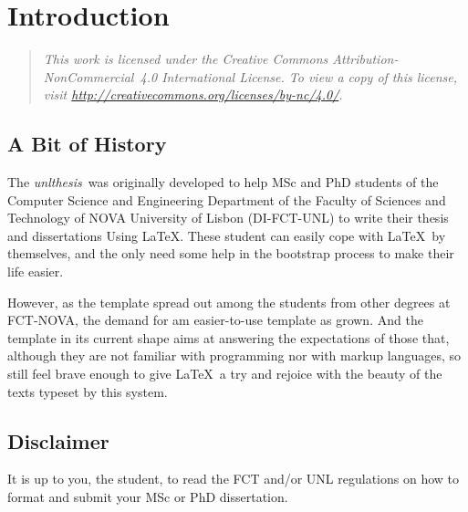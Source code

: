 \newcommand{\unlthesis}{\emph{unlthesis}}
\newcommand{\unlthesisclass}{\texttt{unlthesis.cls}}


\chapter{Introduction}
\label{cha:introduction}

\begin{quotation}
  \itshape
  This work is licensed under the Creative Commons Attribution-NonCommercial~4.0 International License.
  To view a copy of this license, visit \url{http://creativecommons.org/licenses/by-nc/4.0/}.
\end{quotation}

\section{A Bit of History} %
\label{sec:a_bit_of_history}

The \unlthesis\ was originally developed to help MSc and PhD students of the Computer Science and Engineering Department of the Faculty of Sciences and Technology of NOVA University of Lisbon (DI-FCT-UNL) to write their thesis and dissertations Using \LaTeX.
%
These student can easily cope with \LaTeX\ by themselves, and the only need some help in the bootstrap process to make their life easier.

However, as the template spread out among the students from other degrees at FCT-NOVA, the demand for am easier-to-use template as grown.
%
And the template in its current shape aims at answering the expectations of those that, although they are not familiar with programming nor with markup languages, so still feel brave enough to give \LaTeX\ a try and rejoice with the beauty of the texts typeset by this system.



\section{Disclaimer} %
\label{sec:disclaimer}

It is up to you, the student, to read the FCT and/or UNL regulations on how to format and submit your MSc or PhD dissertation.  

